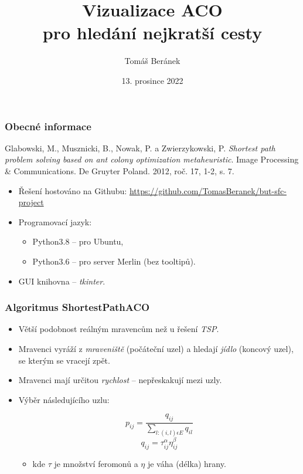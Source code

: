 \documentclass[10pt,xcolor=pdflatex,hyperref={unicode}]{beamer}
\title{Vizualizace ACO \\pro hledání nejkratší cesty}
\author[]{
Tomáš Beránek\\
}
\institute[]{xberan46@stud.fit.vutbr.cz\\
Fakulta informačních technologií Vysokého učení technického v Brně\\
}
\date{13. prosince 2022}
\begin{document}
\frame[plain]{\titlepage}

\begin{frame}
\frametitle{Obecné informace}

Glabowski, M., Musznicki, B., Nowak, P. a Zwierzykowski, P. \emph{Shortest path problem solving based on ant colony optimization metaheuristic}. Image Processing & Communications. De Gruyter Poland. 2012, roč. 17, 1-2, s. 7.

\doublespacing
\begin{itemize}
    \item Řešení hostováno na Githubu: \url{https://github.com/TomasBeranek/but-sfc-project}
    \item Programovací jazyk: 
    \begin{itemize}
        \item Python3.8 -- pro Ubuntu,
        \item Python3.6 -- pro server Merlin (bez tooltipů).
    \end{itemize}
    \item GUI knihovna -- \emph{tkinter}.
\end{itemize}

\end{frame}

\begin{frame}
\frametitle{Algoritmus ShortestPathACO}
\doublespacing
\begin{itemize}    
    \item Větší podobnost reálným mravencům než u řešení \emph{TSP}.
    \singlespacing
    \item Mravenci vyráží z \emph{mraveniště} (počáteční uzel) a hledají \emph{jídlo} (koncový uzel), se kterým se vracejí zpět.
    \item Mravenci mají určitou \emph{rychlost} -- nepřeskakují mezi uzly.
    \doublespacing
    \item Výběr následujícího uzlu:
        \begin{multicols}{2}
        \noindent
        \begin{equation*}
        p_{ij} = \frac{q_{ij}}{\sum_{l:(i,l) \epsilon E}  q_{il}}
        \end{equation*}\notag
        \begin{equation*}
        q_{ij} = \tau^\alpha_{ij}\eta^\beta_{ij}
        \end{equation*}\notag
        \end{multicols}
        
        \begin{itemize}
            \item[] kde $\tau$ je množství feromonů a $\eta$ je váha (délka) hrany.
        \end{itemize}
\end{itemize}
\end{frame}
\end{document}
